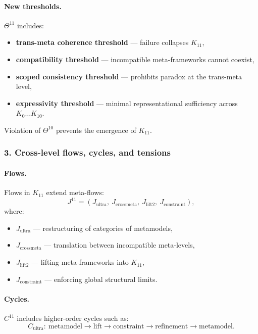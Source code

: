\paragraph{New thresholds.}
$\Theta^{11}$ includes:
\begin{itemize}
  \item \textbf{trans-meta coherence threshold} — failure collapses $K_{11}$,
  \item \textbf{compatibility threshold} — incompatible meta-frameworks
        cannot coexist,
  \item \textbf{scoped consistency threshold} — prohibits paradox at the
        trans-meta level,
  \item \textbf{expressivity threshold} — minimal representational sufficiency
        across $K_0\dots K_{10}$.
\end{itemize}

Violation of $\Theta^{10}$ prevents the emergence of $K_{11}$.

\subsubsection{3. Cross-level flows, cycles, and tensions}

\paragraph{Flows.}
Flows in $K_{11}$ extend meta-flows:
\[
J^{11} = (J_{\mathrm{ultra}},\ J_{\mathrm{crossmeta}},\
         J_{\mathrm{lift2}},\ J_{\mathrm{constraint}}),
\]
where:
\begin{itemize}
  \item $J_{\mathrm{ultra}}$ — restructuring of categories of metamodels,
  \item $J_{\mathrm{crossmeta}}$ — translation between incompatible meta-levels,
  \item $J_{\mathrm{lift2}}$ — lifting meta-frameworks into $K_{11}$,
  \item $J_{\mathrm{constraint}}$ — enforcing global structural limits.
\end{itemize}

\paragraph{Cycles.}
$C^{11}$ includes higher-order cycles such as:
\[
C_{\mathrm{ultra}}:\ 
\text{metamodel} \rightarrow \text{lift} \rightarrow \text{constraint}
\rightarrow \text{refinement} \rightarrow \text{metamodel}.
\]

